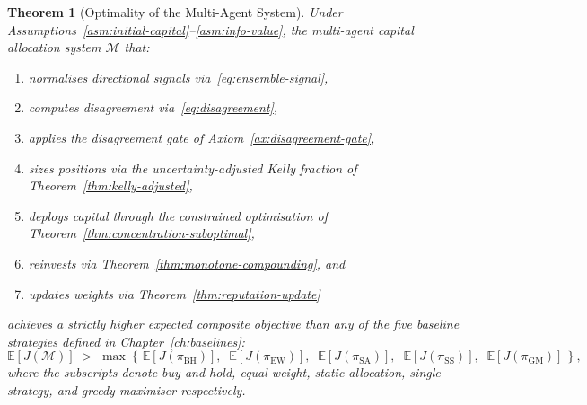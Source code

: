 \documentclass[12pt,openany]{book}
\newcommand{\E}{\mathbb{E}}
\numberwithin{equation}{chapter}
\theoremstyle{plain}
\newtheorem{theorem}{Theorem}[chapter]
\theoremstyle{definition}
\theoremstyle{remark}
\numberwithin{equation}{chapter}
\theoremstyle{plain}
\begin{document}
\begin{theorem}[Optimality of the Multi-Agent System]
\label{thm:main-optimality}
Under Assumptions~\ref{asm:initial-capital}--\ref{asm:info-value},
the multi-agent capital allocation system $\mathcal{M}$ that:
\begin{enumerate}[label=(\roman*)]
  \item normalises directional signals via~\eqref{eq:ensemble-signal},
  \item computes disagreement via~\eqref{eq:disagreement},
  \item applies the disagreement gate of Axiom~\ref{ax:disagreement-gate},
  \item sizes positions via the uncertainty-adjusted Kelly fraction
        of Theorem~\ref{thm:kelly-adjusted},
  \item deploys capital through the constrained optimisation of
        Theorem~\ref{thm:concentration-suboptimal},
  \item reinvests via Theorem~\ref{thm:monotone-compounding}, and
  \item updates weights via Theorem~\ref{thm:reputation-update}
\end{enumerate}
achieves a strictly higher expected composite objective than any of
the five baseline strategies defined in Chapter~\ref{ch:baselines}:
\begin{equation}
  \E[J(\mathcal{M})]
  \;>\;
  \max\!\left\{\,
    \E[J(\pi_{\mathrm{BH}})],\;\;
    \E[J(\pi_{\mathrm{EW}})],\;\;
    \E[J(\pi_{\mathrm{SA}})],\;\;
    \E[J(\pi_{\mathrm{SS}})],\;\;
    \E[J(\pi_{\mathrm{GM}})]
  \,\right\},
  \label{eq:main-dominance}
\end{equation}
where the subscripts denote buy-and-hold, equal-weight, static
allocation, single-strategy, and greedy-maximiser respectively.
\end{theorem}
\end{document}
